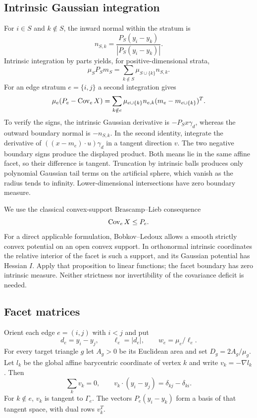 \subsection{Intrinsic Gaussian integration}
For $i\in S$ and $k\notin S$, the inward normal within the stratum is
\[
 n_{S,k}=\frac{P_S(y_i-y_k)}{|P_S(y_i-y_k)|}.
\]
Intrinsic integration by parts yields, for positive-dimensional strata,
\begin{equation}\label{eq:stratum-mean}
 \mu_S P_Sm_S=\sum_{k\notin S}\mu_{S\cup\{k\}}n_{S,k}.
\end{equation}
For an edge stratum $e=\{i,j\}$ a second integration gives
\begin{equation}\label{eq:stratum-cov}
 \mu_e(P_e-\operatorname{Cov}_e X)
 =\sum_{k\notin e}\mu_{e\cup\{k\}}
       n_{e,k}(m_e-m_{e\cup\{k\}})^T.
\end{equation}
To verify the signs, the intrinsic Gaussian derivative is $-P_Sx\gamma_d$,
whereas the outward boundary normal is $-n_{S,k}$. In the second identity,
integrate the derivative of $((x-m_e)\cdot u)\gamma_d$ in a tangent direction
$v$. The two negative boundary signs produce the displayed product.
Both means lie in the same affine facet, so their difference is tangent.
Truncation by intrinsic balls produces only polynomial Gaussian tail terms
on the artificial sphere, which vanish as the radius tends to infinity.
Lower-dimensional intersections have zero boundary measure.

We use the classical convex-support Brascamp--Lieb consequence
\begin{equation}\label{eq:BL}
 \operatorname{Cov}_e X\leq P_e.
\end{equation}
For a direct applicable formulation, Bobkov--Ledoux
\cite[Proposition 2.1]{BL2000} allows a smooth strictly convex potential on
an open convex support. In orthonormal intrinsic coordinates the relative
interior of the facet is such a support, and its Gaussian potential has
Hessian $I$. Apply that proposition to linear functions; the facet boundary
has zero intrinsic measure. Neither strictness nor invertibility of the
covariance deficit is needed.

\subsection{Facet matrices}
Orient each edge $e=(i,j)$ with $i<j$ and put
\[
 d_e=y_i-y_j,\qquad \ell_e=|d_e|,\qquad w_e=\mu_e/\ell_e.
\]
For every target triangle $g$ let $A_g>0$ be its Euclidean area and set
$D_g=2A_g/\mu_g$. Let $l_k$ be the global affine barycentric coordinate
of vertex $k$ and write $v_k=-\nabla l_k$. Then
\begin{equation}\label{eq:barycentric}
 \sum_kv_k=0,\qquad v_k\cdot(y_i-y_j)=\delta_{kj}-\delta_{ki}.
\end{equation}
For $k\notin e$, $v_k$ is tangent to $\Gamma_e$. The vectors
$P_e(y_i-y_k)$ form a basis of that tangent space, with dual rows $v_k^T$.

